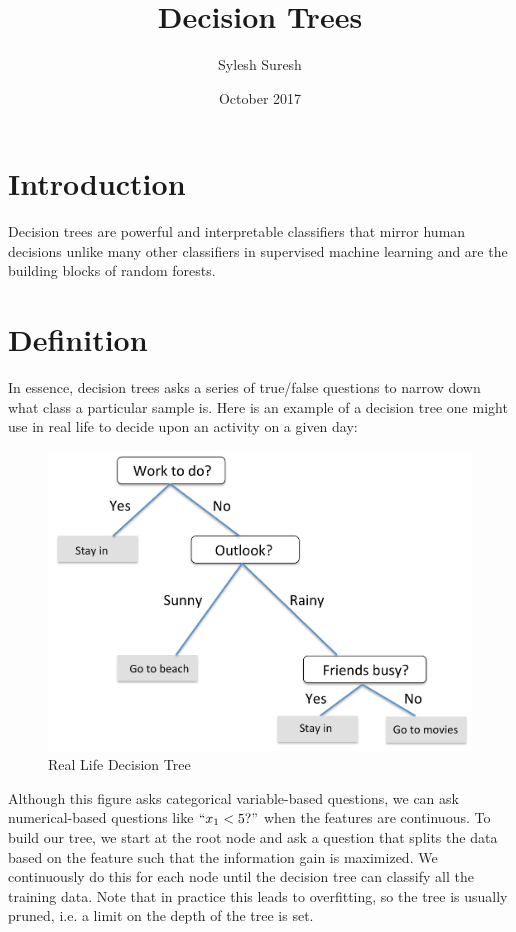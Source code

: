 \documentclass{article}
\title{Decision Trees}
\author{Sylesh Suresh }
\date{October 2017}
\begin{document}
\maketitle

\section{Introduction}
Decision trees are powerful and interpretable classifiers that mirror human decisions unlike many other classifiers in supervised machine learning and are the building blocks of random forests. 
\section{Definition}
In essence, decision trees asks a series of true/false questions to narrow down what class a particular sample is. Here is an example of a decision tree one might use in real life to decide upon an activity on a given day:

\begin{figure}[h!]
\centering
\includegraphics[scale=0.14]{dtree.jpg}
\caption{Real Life Decision Tree}
\label{fig:decisiontree}
\end{figure}

Although this figure asks categorical variable-based questions, we can ask numerical-based questions like \(``x_1 < 5?"\) when the features are continuous. To build our tree, we start at the root node and ask a question that splits the data based on the feature such that the information gain is maximized. We continuously do this for each node until the decision tree can classify all the training data. Note that in practice this leads to overfitting, so the tree is usually pruned, i.e. a limit on the depth of the tree is set. 
\end{document}
